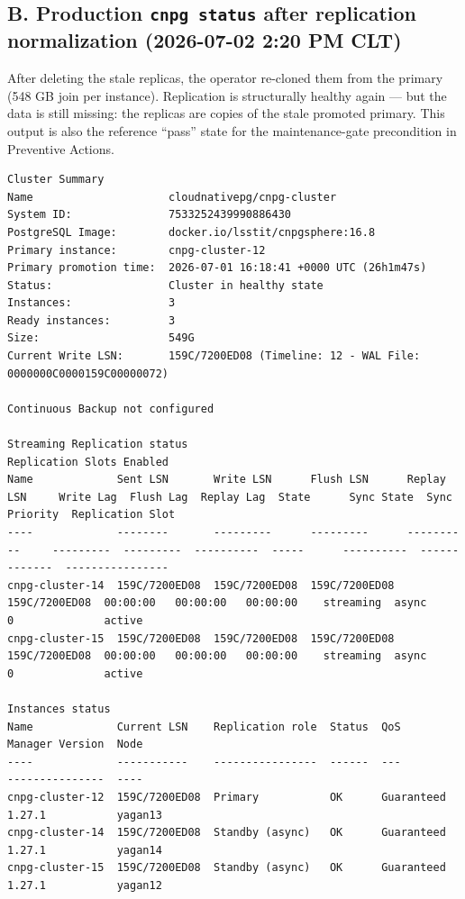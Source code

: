 \documentclass[PMO,authoryear,toc]{lsstdoc}
\begin{document}
\subsection{B. Production \texttt{cnpg status} after replication normalization
(2026-07-02 2:20 PM CLT)}

After deleting the stale replicas, the operator re-cloned them from the
primary (548 GB join per instance). Replication is structurally healthy again
--- but the data is still missing: the replicas are copies of the stale
promoted primary. This output is also the reference ``pass'' state for the
maintenance-gate precondition in Preventive Actions.

{\tiny
\begin{verbatim}
Cluster Summary
Name                     cloudnativepg/cnpg-cluster
System ID:               7533252439990886430
PostgreSQL Image:        docker.io/lsstit/cnpgsphere:16.8
Primary instance:        cnpg-cluster-12
Primary promotion time:  2026-07-01 16:18:41 +0000 UTC (26h1m47s)
Status:                  Cluster in healthy state
Instances:               3
Ready instances:         3
Size:                    549G
Current Write LSN:       159C/7200ED08 (Timeline: 12 - WAL File: 0000000C0000159C00000072)

Continuous Backup not configured

Streaming Replication status
Replication Slots Enabled
Name             Sent LSN       Write LSN      Flush LSN      Replay LSN     Write Lag  Flush Lag  Replay Lag  State      Sync State  Sync Priority  Replication Slot
----             --------       ---------      ---------      ----------     ---------  ---------  ----------  -----      ----------  -------------  ----------------
cnpg-cluster-14  159C/7200ED08  159C/7200ED08  159C/7200ED08  159C/7200ED08  00:00:00   00:00:00   00:00:00    streaming  async       0              active
cnpg-cluster-15  159C/7200ED08  159C/7200ED08  159C/7200ED08  159C/7200ED08  00:00:00   00:00:00   00:00:00    streaming  async       0              active

Instances status
Name             Current LSN    Replication role  Status  QoS         Manager Version  Node
----             -----------    ----------------  ------  ---         ---------------  ----
cnpg-cluster-12  159C/7200ED08  Primary           OK      Guaranteed  1.27.1           yagan13
cnpg-cluster-14  159C/7200ED08  Standby (async)   OK      Guaranteed  1.27.1           yagan14
cnpg-cluster-15  159C/7200ED08  Standby (async)   OK      Guaranteed  1.27.1           yagan12
\end{verbatim}
}
\end{document}
